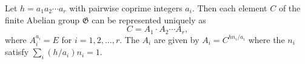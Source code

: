 Let $h = a_1 a_2 \cdots a_r$ with pairwise coprime integers $a_i$. Then each element $C$ of the finite Abelian group $\mathfrak{G}$ can be represented uniquely as
$$C = A_1 \cdot A_2 \cdots A_r,$$
where $A_i^{a_i} = E$ for $i = 1, 2, \ldots, r$. The $A_i$ are given by $A_i = C^{h n_i / a_i}$ where the $n_i$ satisfy $\sum_i (h/a_i) n_i = 1$.
